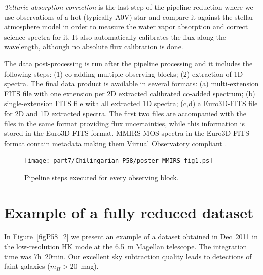 \emph{Telluric absorption correction} is the last step of the pipeline reduction where we use observations of a hot (typically A0V) star and compare it against the stellar atmosphere model in order to measure the water vapor absorption and correct science spectra for it. It also automatically calibrates the flux along the wavelength, although no absolute flux calibration is done.

The data post-processing is run after the pipeline processing and it includes the following steps: (1) co-adding multiple observing blocks; (2) extraction of 1D spectra.  The final data product is available in several formats: (a) multi-extension FITS file with one extension per 2D extracted calibrated co-added spectrum; (b) single-extension FITS file with all extracted 1D spectra; (c,d) a Euro3D-FITS file for 2D and 1D extracted spectra.  The first two files are accompanied with the files in the same format providing flux uncertainties, while this information is stored in the Euro3D-FITS format.  MMIRS MOS spectra in the Euro3D-FITS format contain metadata making them Virtual Observatory compliant \citep{CBLM06,Chilingarian+08b}.

\begin{figure}
\texttt{[image: part7/Chilingarian\_P58/poster\_MMIRS\_fig1.ps]}
\caption{Pipeline steps executed for every observing block.\label{figP58_1}}
\end{figure}

\section{Example of a fully reduced dataset}

In Figure~\ref{figP58_2} we present an example of a dataset obtained in Dec~2011 in the low-resolution HK mode at the 6.5~m Magellan telescope. The integration time was 7h~20min. Our excellent sky subtraction quality leads to detections of faint galaxies ($m_H>20$~mag).


